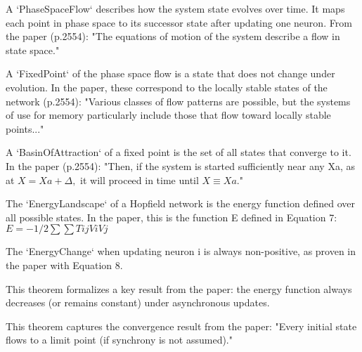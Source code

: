 \begin{definition}\label{PhaseSpaceFlow}
\leanok
A `PhaseSpaceFlow` describes how the system state evolves over time.
It maps each point in phase space to its successor state after updating one neuron.
From the paper (p.2554): "The equations of motion of the system describe a flow in state space."
\end{definition}


\begin{definition}\label{FixedPoint}
\leanok
A `FixedPoint` of the phase space flow is a state that does not change under evolution.
In the paper, these correspond to the locally stable states of the network (p.2554):
"Various classes of flow patterns are possible, but the systems of use for memory
particularly include those that flow toward locally stable points..."
\end{definition}


\begin{definition}\label{BasinOfAttraction}
\leanok
A `BasinOfAttraction` of a fixed point is the set of all states that converge to it.
In the paper (p.2554): "Then, if the system is started sufficiently near any Xa,
as at $X = Xa + \Delta,$ it will proceed in time until $X \equiv Xa.$"
\end{definition}


\begin{definition}\label{EnergyLandscape}
\leanok
The `EnergyLandscape` of a Hopfield network is the energy function defined over all possible states.
In the paper, this is the function E defined in Equation 7:
   $ E = -1/2 \sum \sum Tij Vi Vj$
\end{definition}


\begin{definition}\label{EnergyChange}
\leanok
The `EnergyChange` when updating neuron i is always non-positive,
as proven in the paper with Equation 8.

This theorem formalizes a key result from the paper: the energy function
always decreases (or remains constant) under asynchronous updates.
\end{definition}


\begin{definition}\label{convergence_to_fixed_point}
\leanok
This theorem captures the convergence result from the paper:
"Every initial state flows to a limit point (if synchrony is not assumed)."
\end{definition}






